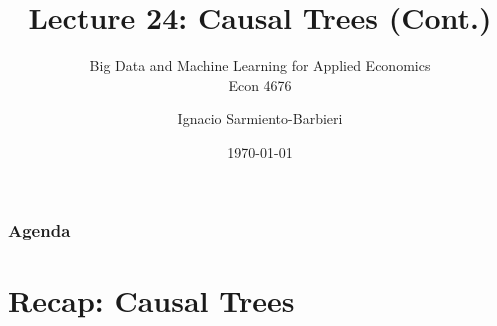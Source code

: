 \documentclass[
  shownotes,
  xcolor={svgnames},
  hyperref={colorlinks,citecolor=DarkBlue,linkcolor=DarkRed,urlcolor=DarkBlue}
  , aspectratio=169]{beamer}
\begin{document}
 
\title[Lecture 24]{Lecture 24:  Causal Trees (Cont.)}
\subtitle{Big Data and Machine Learning for Applied Economics \\ Econ 4676}
\date{\today}

\author[Sarmiento-Barbieri]{Ignacio Sarmiento-Barbieri}


\begin{frame}[noframenumbering]
\maketitle
\end{frame}






\begin{frame}
\frametitle{Agenda}

\tableofcontents

\end{frame}
\section{Recap: Causal Trees}
\end{document}
